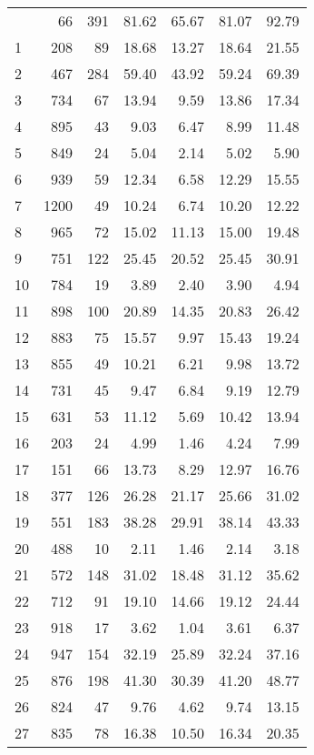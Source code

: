 \begin{center}
\begin{longtable}{lrrr|rrr}
  \hline
  \endfoot
    0 &  66 & 391 & 81.62 & 65.67 & 81.07 & 92.79 \\ 
    1 & 208 & 89 & 18.68 & 13.27 & 18.64 & 21.55 \\ 
    2 & 467 & 284 & 59.40 & 43.92 & 59.24 & 69.39 \\ 
    3 & 734 & 67 & 13.94 & 9.59 & 13.86 & 17.34 \\ 
    4 & 895 & 43 & 9.03 & 6.47 & 8.99 & 11.48 \\ 
    5 & 849 & 24 & 5.04 & 2.14 & 5.02 & 5.90 \\ 
    6 & 939 & 59 & 12.34 & 6.58 & 12.29 & 15.55 \\ 
    7 & 1200 & 49 & 10.24 & 6.74 & 10.20 & 12.22 \\ 
    8 & 965 & 72 & 15.02 & 11.13 & 15.00 & 19.48 \\ 
    9 & 751 & 122 & 25.45 & 20.52 & 25.45 & 30.91 \\ 
   10 & 784 & 19 & 3.89 & 2.40 & 3.90 & 4.94 \\ 
   11 & 898 & 100 & 20.89 & 14.35 & 20.83 & 26.42 \\ 
   12 & 883 & 75 & 15.57 & 9.97 & 15.43 & 19.24 \\ 
   13 & 855 & 49 & 10.21 & 6.21 & 9.98 & 13.72 \\ 
   14 & 731 & 45 & 9.47 & 6.84 & 9.19 & 12.79 
    \label{Sec7_mftable} \\
   15 & 631 & 53 & 11.12 & 5.69 & 10.42 & 13.94 \\ 
   16 & 203 & 24 & 4.99 & 1.46 & 4.24 & 7.99 \\ 
   17 & 151 & 66 & 13.73 & 8.29 & 12.97 & 16.76 \\ 
   18 & 377 & 126 & 26.28 & 21.17 & 25.66 & 31.02 \\ 
   19 & 551 & 183 & 38.28 & 29.91 & 38.14 & 43.33 \\ 
   20 & 488 & 10 & 2.11 & 1.46 & 2.14 & 3.18 \\ 
   21 & 572 & 148 & 31.02 & 18.48 & 31.12 & 35.62 \\ 
   22 & 712 & 91 & 19.10 & 14.66 & 19.12 & 24.44 \\ 
   23 & 918 & 17 & 3.62 & 1.04 & 3.61 & 6.37 \\ 
   24 & 947 & 154 & 32.19 & 25.89 & 32.24 & 37.16 \\ 
   25 & 876 & 198 & 41.30 & 30.39 & 41.20 & 48.77 \\ 
   26 & 824 & 47 & 9.76 & 4.62 & 9.74 & 13.15 \\ 
   27 & 835 & 78 & 16.38 & 10.50 & 16.34 & 20.35 \\ 

\end{longtable}
\end{center}
